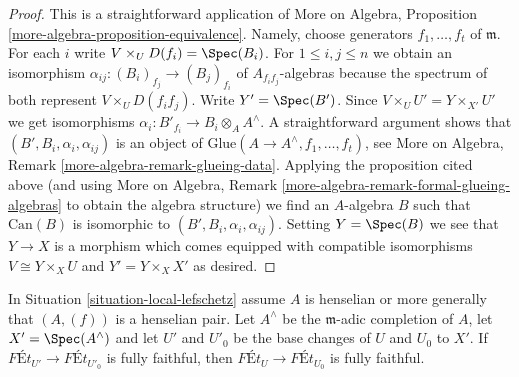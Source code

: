 \begin{proof}
This is a straightforward application of
More on Algebra, Proposition \ref{more-algebra-proposition-equivalence}.
Namely, choose generators $f_1, \ldots, f_t$ of $\mathfrak m$.
For each $i$ write $V \times_U D(f_i) = \Spec(B_i)$.
For $1 \leq i, j \leq n$ we obtain an isomorphism
$\alpha_{ij} : (B_i)_{f_j} \to (B_j)_{f_i}$ of $A_{f_if_j}$-algebras
because the spectrum of both represent $V \times_U D(f_if_j)$.
Write $Y' = \Spec(B')$. Since $V \times_U U' = Y \times_{X'} U'$
we get isomorphisms $\alpha_i : B'_{f_i} \to B_i \otimes_A A^\wedge$.
A straightforward argument shows that $(B', B_i, \alpha_i, \alpha_{ij})$
is an object of $\text{Glue}(A \to A^\wedge, f_1, \ldots, f_t)$, see
More on Algebra, Remark \ref{more-algebra-remark-glueing-data}.
Applying the proposition cited above (and using
More on Algebra, Remark \ref{more-algebra-remark-formal-glueing-algebras}
to obtain the algebra structure) we find an $A$-algebra $B$ such that
$\text{Can}(B)$ is isomorphic to $(B', B_i, \alpha_i, \alpha_{ij})$.
Setting $Y = \Spec(B)$ we see that $Y \to X$ is a morphism
which comes equipped with compatible isomorphisms
$V \cong Y \times_X U$ and $Y' = Y \times_X X'$ as desired.
\end{proof}

\begin{lemma}
\label{lemma-fully-faithful-henselian-completion}
In Situation \ref{situation-local-lefschetz} assume $A$ is henselian
or more generally that $(A, (f))$ is a henselian pair.
Let $A^\wedge$ be the $\mathfrak m$-adic completion of $A$,
let $X' = \Spec(A^\wedge)$ and let $U'$ and $U'_0$ be the base changes of
$U$ and $U_0$ to $X'$. If $\textit{F\'Et}_{U'} \to \textit{F\'Et}_{U'_0}$
is fully faithful, then $\textit{F\'Et}_U \to \textit{F\'Et}_{U_0}$
is fully faithful.
\end{lemma}

